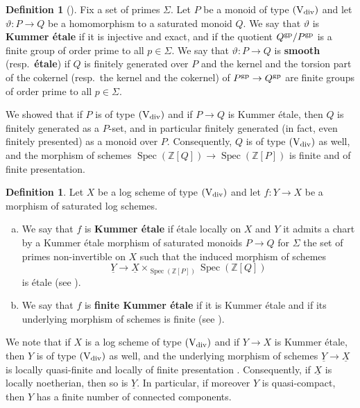 \documentclass[a4paper,twoside,11pt,reqno]{amsart}
\renewcommand{\mathbb}{\mathds}
\newcommand{\bZ}{{\mathbb Z}}
\newcommand{\la}{\longrightarrow}
\DeclareMathOperator{\Spec}{Spec}
\newcommand{\gp}{{\rm gp}}
\newcommand{\vtheta}{\vartheta}
\newcommand{\typeVd}{(\mathrm{V}_{\rm div})}
\theoremstyle{definition}
\newtheorem{defi}[thm]{Definition}
\numberwithin{equation}{subsection}
\begin{document}
\begin{defi}[{\cite[Definition~2.4.4 and Lemma~2.6.1]{AHLS-Log}}] \label{def:Kummer-etale-monoid}
    Fix a set of primes $\Sigma$. Let $P$ be a monoid of type $\typeVd$ and let $\vtheta\colon P\to Q$ be a homomorphism to a saturated monoid $Q$. We say that $\vtheta$ is {\bf Kummer \'etale} if it is injective and exact, and if the quotient $Q^\gp/P^\gp$ is a finite group of order prime to all $p\in \Sigma$. We say that $\vtheta \colon P\to Q$ is {\bf smooth} (resp.\ {\bf \'etale}) if $Q$ is finitely generated over $P$ and the kernel and the torsion part of the cokernel (resp.\ the kernel and the cokernel) of $P^{\rm gp}\to Q^{\rm gp}$ are finite groups of order prime to all $p\in \Sigma$.
\end{defi}

We showed \cite[Lemma~2.6.2]{AHLS-Log} that if $P$ is of type $\typeVd$ and if $P\to Q$ is Kummer \'etale, then $Q$ is finitely generated as a $P$-set, and in particular finitely generated (in fact, even finitely presented) as a monoid over $P$. Consequently, $Q$ is of type $\typeVd$ as well, and the morphism of schemes $\Spec(\bZ[Q])\to \Spec(\bZ[P])$ is finite and of finite presentation. 

\begin{defi} \label{def:Kummer-etale-map}
    Let $X$ be a log scheme of type $\typeVd$ and let $f\colon Y\to X$ be a morphism of saturated log schemes. 
    \begin{enumerate}[(a)]
        \item 
        We say that $f$ is {\bf Kummer \'etale} if \'etale locally on $X$ and $Y$ it admits a chart by a Kummer \'etale morphism of saturated monoids $P\to Q$ for $\Sigma$ the set of primes non-invertible on $X$ such that the induced morphism of schemes
        \[ 
            \underline{Y} \la \underline{X}\times_{\Spec(\bZ[P])} \Spec(\bZ[Q])
        \]
        is \'etale (see \cite[Definition~3.5.1]{AHLS-Log}).
        \item 
        We say that $f$ is {\bf finite Kummer \'etale} if it is Kummer \'etale and if its underlying morphism of schemes is finite (see \cite[Definition~4.2.1 and Corollary~5.1.2]{AHLS-Log}).
    \end{enumerate}
\end{defi}

We note that if $X$ is a log scheme of type $\typeVd$ and if $Y\to X$ is Kummer \'etale, then $Y$ is of type $\typeVd$ as well, and the underlying morphism of schemes $\underline{Y}\to \underline{X}$ is locally quasi-finite and locally of finite presentation \cite[Proposition~5.1.2]{AHLS-Log}. Consequently, if $\underline{X}$ is locally noetherian, then so is $\underline{Y}$. In particular, if moreover $Y$ is quasi-compact, then $Y$ has a finite number of connected components.
\end{document}
